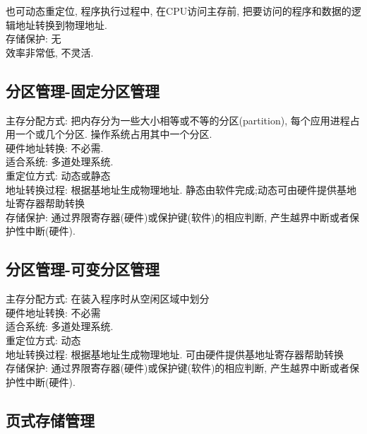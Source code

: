 \documentclass[a4paper, 12pt, notitlepage]{article}
\begin{document}
	也可动态重定位, 程序执行过程中, 在CPU访问主存前, 把要访问的程序和数据的逻辑地址转换到物理地址. \\
	
	存储保护: 无 \\
	
	效率非常低, 不灵活. 

\subsection{分区管理-固定分区管理}

	主存分配方式: 把内存分为一些大小相等或不等的分区(partition), 每个应用进程占用一个或几个分区. 操作系统占用其中一个分区. \\
	
	硬件地址转换: 不必需. \\
	
	适合系统: 多道处理系统. \\
	
	重定位方式: 动态或静态 \\
	
	地址转换过程: 根据基地址生成物理地址. 静态由软件完成;动态可由硬件提供基地址寄存器帮助转换 \\
	
	存储保护: 通过界限寄存器(硬件)或保护键(软件)的相应判断, 产生越界中断或者保护性中断(硬件). \\

\subsection{分区管理-可变分区管理}

	主存分配方式: 在装入程序时从空闲区域中划分 \\
	
	硬件地址转换: 不必需 \\
	
	适合系统: 多道处理系统. \\
	
	重定位方式: 动态 \\
	
	地址转换过程: 根据基地址生成物理地址. 可由硬件提供基地址寄存器帮助转换 \\
	
	存储保护: 通过界限寄存器(硬件)或保护键(软件)的相应判断, 产生越界中断或者保护性中断(硬件). \\

\subsection{页式存储管理}
\end{document}
